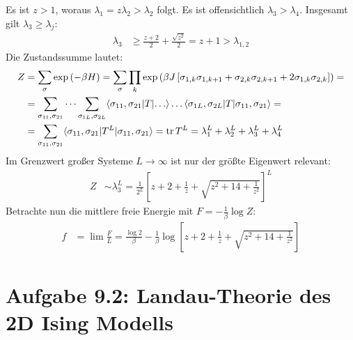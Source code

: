 \documentclass[a4paper,12pt]{article}
\newcommand{\braket}{}
\newcommand{\kla}{}
\newcommand{\klam}{}
\newcommand{\tecxt}{}
\begin{document}
Es ist $z>1$, woraus $\lambda_1=z\lambda_2>\lambda_2$ folgt. Es ist offensichtlich $\lambda_3>\lambda_4$. Insgesamt gilt $\lambda_3\ge\lambda_j$:
\begin{align*}
\lambda_3&\ge\frac{z+2}{2}+\frac{\sqrt{z^2}}{2}=z+1>\lambda_{1,2}
\end{align*}
Die Zustandssumme lautet:
\begin{align*}
Z&=\sum_\sigma\exp\kla\left( {-\beta H} \right)=\sum_\sigma\prod_k\exp\kla\left( {\beta J\klam\left[ {\sigma_{1,k}\sigma_{1,k+1}+\sigma_{2,k}\sigma_{2,k+1}+2\sigma_{1,k}\sigma_{2,k}} \right]} \right)=\\
&=\sum_{\sigma_{11},\sigma_{21}}\dots\sum_{\sigma_{1L},\sigma_{2L}}\braket\langle {\sigma_{11},\sigma_{21}} | {T} | {\dots}\rangle\dots\braket\langle {\sigma_{1L},\sigma_{2L}} | {T} | {\sigma_{11},\sigma_{21}}\rangle=\\
&=\sum_{\sigma_{11},\sigma_{21}}\braket\langle {\sigma_{11},\sigma_{21}} | {T^L} | {\sigma_{11},\sigma_{21}}\rangle=\tecxt\text{tr\,}T^L=\lambda_1^L+\lambda_2^L+\lambda_3^L+\lambda_4^L
\end{align*}
Im Grenzwert großer Systeme $L\rightarrow\infty$ ist nur der größte Eigenwert relevant:
\begin{align*}
Z&\sim\lambda_3^L=\frac{1}{2^L}\klam\left[ {z+2+\frac{1}{z}+\sqrt{z^2+14+\frac{1}{z^2}}} \right]^L
\end{align*}
Betrachte nun die mittlere freie Energie mit $F=-\frac{1}{\beta}\log Z$:
\begin{align*}
f&=\lim\frac{F}{L}=\frac{\log 2}{\beta}-\frac{1}{\beta}\log\klam\left[ {z+2+\frac{1}{z}+\sqrt{z^2+14+\frac{1}{z^2}}} \right]
\end{align*}
\section*{Aufgabe 9.2: Landau-Theorie des 2D Ising Modells}
\end{document}
